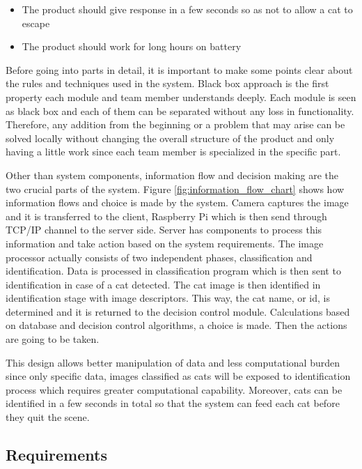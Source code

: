 \begin{itemize}
    \item The product should give response in a few seconds so as not to allow a cat to escape
    \item The product should work for long hours on battery
\end{itemize}

Before going into parts in detail, it is important to make some points clear about the rules and techniques used in the system. Black box approach is the first property each module and team member understands deeply. Each module is seen as black box and each of them can be separated without any loss in functionality. Therefore, any addition from the beginning or a problem that may arise can be solved locally without changing the overall structure of the product and only having a little work since each team member is specialized in the specific part.






Other than system components, information flow and decision making are the two crucial parts of the system. Figure \ref{fig:information_flow_chart} shows how information flows and choice is made by the system. Camera captures the image and it is transferred to the client, Raspberry Pi which is then send through TCP/IP channel to the server side. Server has components to process this information and take action based on the system requirements. The image processor actually consists of two independent phases, classification and identification. Data is processed in classification program which is then sent to identification in case of a cat detected. The cat image is then identified in identification stage with image descriptors. This way, the cat name, or id, is determined and it is returned to the decision control module. Calculations based on database and decision control algorithms, a choice is made. Then the actions are going to be taken.

This design allows better manipulation of data and less computational burden since only specific data, images classified as cats will be exposed to identification process which requires greater computational capability. Moreover, cats can be identified in a few seconds in total so that the system can feed each cat before they quit the scene.

\subsection{Requirements}

